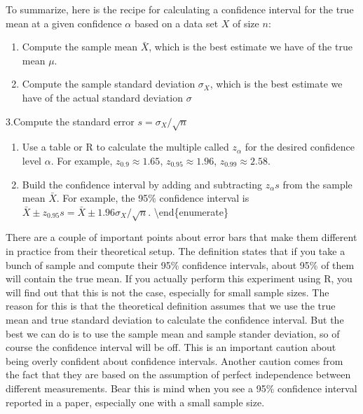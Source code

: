 \documentclass[
  letterpaper,
  DIV=11,
  numbers=noendperiod]{scrreprt}
\begin{document}
To summarize, here is the recipe for calculating a confidence interval
for the true mean at a given confidence \(\alpha\) based on a data set
\(X\) of size \(n\):

\begin{enumerate}
\def\labelenumi{\arabic{enumi}.}
\item
  Compute the sample mean \(\bar X\), which is the best estimate we have
  of the true mean \(\mu\).
\item
  Compute the sample standard deviation \(\sigma_{X}\), which is the
  best estimate we have of the actual standard deviation \(\sigma\)
\end{enumerate}

3.Compute the standard error \(s = \sigma_X/\sqrt{n}\)

\begin{enumerate}
\def\labelenumi{\arabic{enumi}.}
\setcounter{enumi}{3}
\item
  Use a table or R to calculate the multiple called \(z_\alpha\) for the
  desired confidence level \(\alpha\). For example,
  \(z_{0.9} \approx 1.65\), \(z_{0.95} \approx 1.96\),
  \(z_{0.99} \approx 2.58\).
\item
  Build the confidence interval by adding and subtracting \(z_\alpha s\)
  from the sample mean \(\bar X\). For example, the 95\% confidence
  interval is
  \(\bar X \pm z_{0.95} s= \bar X \pm 1.96\sigma_{X}/\sqrt{n}\).
  \textbackslash end\{enumerate\}
\end{enumerate}

There are a couple of important points about error bars that make them
different in practice from their theoretical setup. The definition
states that if you take a bunch of sample and compute their 95\%
confidence intervals, about 95\% of them will contain the true mean. If
you actually perform this experiment using R, you will find out that
this is not the case, especially for small sample sizes. The reason for
this is that the theoretical definition assumes that we use the true
mean and true standard deviation to calculate the confidence interval.
But the best we can do is to use the sample mean and sample stander
deviation, so of course the confidence interval will be off. This is an
important caution about being overly confident about confidence
intervals. Another caution comes from the fact that they are based on
the assumption of perfect independence between different measurements.
Bear this is mind when you see a 95\% confidence interval reported in a
paper, especially one with a small sample size.
\end{document}
